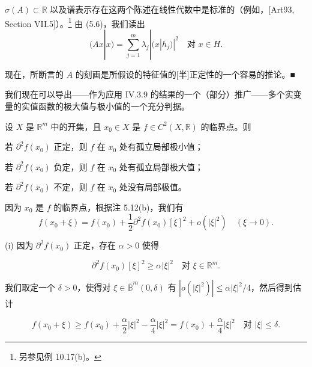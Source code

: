 \begin{remark}
\begin{items}
\proofhead
$ \sigma(A) \subset \mathbb{R} $ 以及谱表示存在这两个陈述在线性代数中是标准的（例如，[Art93, Section VII.5]）。\footnote{另参见例 10.17(b)。}
由 (5.6)，我们读出
\[
(Ax|x) = \sum_{j=1}^{m}\lambda_{j}|(x|h_{j})|^{2} \quad \text{对 } x \in H .
\]

现在，所断言的 $ A $ 的刻画是所假设的特征值的[半]正定性的一个容易的推论。\nobreak\hspace{0.35em}■

\end{items}

我们现在可以导出——作为应用 IV.3.9 的结果的一个（部分）推广——多个实变量的实值函数的极大值与极小值的一个充分判据。

\end{remark}

\begin{theorem}

设 $ X $ 是 $ \mathbb{R}^{m} $ 中的开集，且 $ x_{0} \in X $ 是 $ f \in C^{2}(X, \mathbb{R}) $ 的临界点。则

\begin{subitems}
\item

若 $ \partial^{2}f(x_{0}) $ 正定，则 $ f $ 在 $ x_{0} $ 处有孤立局部极小值；

\item

若 $ \partial^{2}f(x_{0}) $ 负定，则 $ f $ 在 $ x_{0} $ 处有孤立局部极大值；

\item

若 $ \partial^{2}f(x_{0}) $ 不定，则 $ f $ 在 $ x_{0} $ 处没有局部极值。

\proofhead
因为 $ x_{0} $ 是 $ f $ 的临界点，根据注 5.12(b)，我们有
\[
f(x_{0} + \xi) = f(x_{0}) + \frac{1}{2}\partial^{2}f(x_{0})[\xi]^{2} + o(|\xi|^{2}) \quad (\xi \to 0) .
\]
\end{subitems}

(i) 因为 $ \partial^{2}f(x_{0}) $ 正定，存在 $ \alpha > 0 $ 使得

\[
\partial^{2}f(x_{0})[\xi]^{2} \ge \alpha|\xi|^{2} \quad \text{对 } \xi \in \mathbb{R}^{m} .
\]

我们取定一个 $ \delta > 0 $，使得对 $ \xi \in \bar{\mathbb{B}}^{m}(0, \delta) $ 有 $ |o(|\xi|^{2})| \le \alpha|\xi|^{2}/4 $，然后得到估计

\[
f(x_{0} + \xi) \ge f(x_{0}) + \frac{\alpha}{2}|\xi|^{2} - \frac{\alpha}{4}|\xi|^{2} = f(x_{0}) + \frac{\alpha}{4}|\xi|^{2} \quad \text{对 } |\xi| \le \delta .
\]


\end{theorem}

